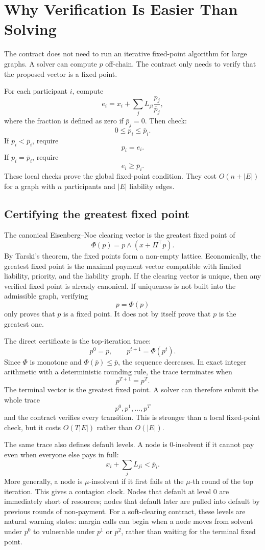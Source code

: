\documentclass[11pt,oneside]{article}
\newcommand{\barp}{\bar p}
\newcommand{\estate}{e}
\begin{document}
\section{Why Verification Is Easier Than Solving}

The contract does not need to run an iterative fixed-point algorithm for large
graphs. A solver can compute $p$ off-chain. The contract only needs to verify
that the proposed vector is a fixed point.

For each participant $i$, compute
\[
  \estate_i = x_i + \sum_j L_{ji}\frac{p_j}{\barp_j},
\]
where the fraction is defined as zero if $\barp_j=0$. Then check:
\[
  0 \leq p_i \leq \barp_i.
\]
If $p_i < \barp_i$, require
\[
  p_i = \estate_i.
\]
If $p_i=\barp_i$, require
\[
  \estate_i \geq \barp_i.
\]
These local checks prove the global fixed-point condition. They cost
$O(n+|E|)$ for a graph with $n$ participants and $|E|$ liability edges.

\subsection{Certifying the greatest fixed point}

The canonical Eisenberg--Noe clearing vector is the greatest fixed point of
\[
  \Phi(p)=\barp \wedge (x+\Pi^\top p).
\]
By Tarski's theorem, the fixed points form a non-empty lattice. Economically,
the greatest fixed point is the maximal payment vector compatible with limited
liability, priority, and the liability graph. If the clearing vector is unique,
then any verified fixed point is already canonical. If uniqueness is not built
into the admissible graph, verifying
\[
  p=\Phi(p)
\]
only proves that $p$ is a fixed point. It does not by itself prove that $p$ is
the greatest one.

The direct certificate is the top-iteration trace:
\[
  p^0=\barp,\qquad p^{t+1}=\Phi(p^t).
\]
Since $\Phi$ is monotone and $\Phi(\barp)\leq \barp$, the sequence decreases.
In exact integer arithmetic with a deterministic rounding rule, the trace
terminates when
\[
  p^{T+1}=p^T.
\]
The terminal vector is the greatest fixed point. A solver can therefore submit
the whole trace
\[
  p^0,p^1,\ldots,p^T
\]
and the contract verifies every transition. This is stronger than a local
fixed-point check, but it costs $O(T|E|)$ rather than $O(|E|)$.

The same trace also defines default levels. A node is $0$-insolvent if it
cannot pay even when everyone else pays in full:
\[
  x_i+\sum_j L_{ji}<\barp_i.
\]
More generally, a node is $\mu$-insolvent if it first fails at the $\mu$-th
round of the top iteration. This gives a contagion clock. Nodes that default at
level $0$ are immediately short of resources; nodes that default later are
pulled into default by previous rounds of non-payment. For a soft-clearing
contract, these levels are natural warning states: margin calls can begin when
a node moves from solvent under $p^0$ to vulnerable under $p^1$ or $p^2$,
rather than waiting for the terminal fixed point.
\end{document}
